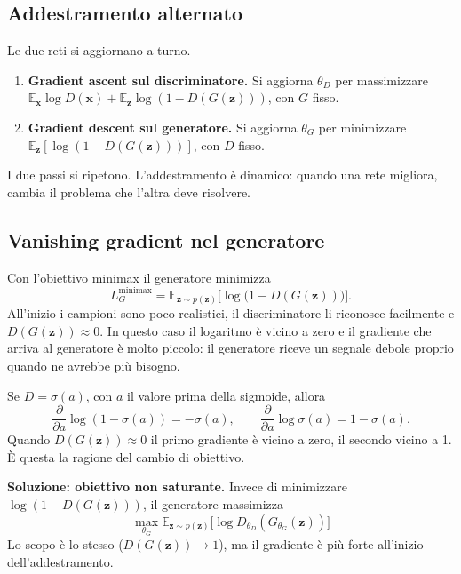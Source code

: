 \documentclass[11pt,a4paper]{article}
\providecommand{\E}{\mathbb{E}}
\begin{document}
\subsection{Addestramento alternato}

Le due reti si aggiornano a turno.
\begin{enumerate}
  \item \textbf{Gradient ascent sul discriminatore.} Si aggiorna $\theta_D$ per
        massimizzare
        $\E_{\mathbf{x}}\log D(\mathbf{x})+\E_{\mathbf{z}}\log(1-D(G(\mathbf{z})))$,
        con $G$ fisso.
  \item \textbf{Gradient descent sul generatore.} Si aggiorna $\theta_G$ per
        minimizzare $\E_{\mathbf{z}}[\log(1-D(G(\mathbf{z})))]$, con $D$ fisso.
\end{enumerate}
I due passi si ripetono. L'addestramento è dinamico: quando una rete migliora,
cambia il problema che l'altra deve risolvere.

\subsection{Vanishing gradient nel generatore}

Con l'obiettivo minimax il generatore minimizza
\[
L_G^{\mathrm{minimax}}=\E_{\mathbf{z}\sim p(\mathbf{z})}\big[\log\big(1-D(G(\mathbf{z}))\big)\big].
\]
All'inizio i campioni sono poco realistici, il discriminatore li riconosce
facilmente e $D(G(\mathbf{z}))\approx 0$. In questo caso il logaritmo è vicino a
zero e il gradiente che arriva al generatore è molto piccolo: il generatore
riceve un segnale debole proprio quando ne avrebbe più bisogno.

\begin{osservazione}
Se $D=\sigma(a)$, con $a$ il valore prima della sigmoide, allora
\[
\frac{\partial}{\partial a}\log(1-\sigma(a))=-\sigma(a),
\qquad
\frac{\partial}{\partial a}\log\sigma(a)=1-\sigma(a).
\]
Quando $D(G(\mathbf{z}))\approx0$ il primo gradiente è vicino a zero, il secondo
vicino a 1. È questa la ragione del cambio di obiettivo.
\end{osservazione}

\textbf{Soluzione: obiettivo non saturante.} Invece di minimizzare
$\log(1-D(G(\mathbf{z})))$, il generatore massimizza
\[
\boxed{\max_{\theta_G}\E_{\mathbf{z}\sim p(\mathbf{z})}\big[\log D_{\theta_D}(G_{\theta_G}(\mathbf{z}))\big]}
\]
Lo scopo è lo stesso ($D(G(\mathbf{z}))\to1$), ma il gradiente è più forte
all'inizio dell'addestramento.
\end{document}
